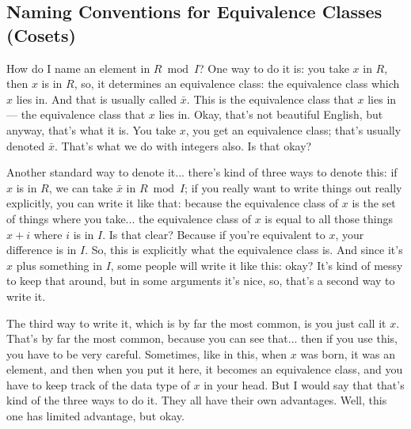 \subsection{Naming Conventions for Equivalence Classes (Cosets)}

\begin{speech}[00:36:03 - 00:37:33]
How do I name an element in $R \bmod I$? One way to do it is: you take $x$ in $R$,  then $x$ is in $R$, so, it determines an equivalence class: the equivalence class which $x$ lies in. And that is usually called $\bar{x}$.  This is the equivalence class that $x$ lies in --- the equivalence class that $x$ lies in. Okay, that's not beautiful English, but anyway, that's what it is. You take $x$, you get an equivalence class; that's usually denoted $\bar{x}$. That's what we do with integers also. Is that okay? 

Another standard way to denote it... there's kind of three ways to denote this: if $x$ is in $R$, we can take $\bar{x}$ in $R \bmod I$;  if you really want to write things out really explicitly, you can write it like that:  because the equivalence class of $x$ is the set of things where you take... the equivalence class of $x$ is equal to all those things $x + i$ where $i$ is in $I$.  Is that clear? Because if you're equivalent to $x$, your difference is in $I$. So, this is explicitly what the equivalence class is. And since it's $x$ plus something in $I$, some people will write it like this:  okay? It's kind of messy to keep that around, but in some arguments it's nice, so, that's a second way to write it. 

The third way to write it, which is by far the most common, is you just call it $x$.  That's by far the most common, because you can see that... then if you use this, you have to be very careful. Sometimes, like in this, when $x$ was born, it was an element, and then when you put it here, it becomes an equivalence class, and you have to keep track of the data type of $x$ in your head. But I would say that that's kind of the three ways to do it. They all have their own advantages. Well, this one has limited advantage, but okay.
\end{speech}

